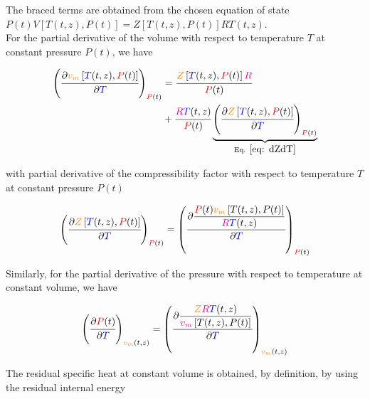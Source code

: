 \documentclass[../Article_Model_Parameters.tex]{subfiles}
\begin{document}
	The braced terms are obtained from the chosen equation of state $P(t) V\left[T(t,z),P(t)\right] = Z\left[T(t,z),P(t)\right] R T(t,z)$. \\
	
	For the partial derivative of the volume with respect to temperature $T$ at constant pressure $P(t)$, we have

	{\footnotesize
	\begin{align}
		\left( \cfrac{\partial {\color{orange}v_m}\left[{\color{blue}T}(t,z), {\color{red}P}(t)\right]}{\partial {\color{blue}T}} \right)_{{\color{red}P}(t)} &= \cfrac{{\color{orange}Z}\left[{\color{blue}T}(t,z), {\color{red}P}(t)\right] {\color{magenta}R}}{{\color{red}P}(t)} \nonumber \\
		&+ \cfrac{{\color{magenta}R}{\color{blue}T}(t,z)}{{\color{red}P}(t)} \underbrace{\left( \cfrac{\partial {\color{orange}Z}\left[{\color{blue}T}(t,z), {\color{red}P}(t)\right]}{\partial {\color{blue}T}} \right)_{{\color{red}P}(t)}}_{\text{Eq. }\eqref{eq: dZdT}} \label{eq: dVdT}
	\end{align} }
 
	with partial derivative of the compressibility factor with respect to temperature $T$ at constant pressure $P(t)$

	{\footnotesize
	\begin{equation}
		\left(\cfrac{\partial{\color{orange}Z}\left[{\color{blue}T}(t,z), {\color{red}P}(t)\right]}{\partial {\color{blue}T}}\right)_{{\color{red}P}(t)} = \left(\cfrac{\partial \dfrac{{\color{red}P}(t) {\color{orange}v_m}\left[T(t,z),P(t)\right]}{{\color{magenta}R}{\color{blue}T}(t,z)}}{\partial {\color{blue}T}}\right)_{{\color{red}P}(t)} \label{eq: dZdT}
	\end{equation} }

	Similarly, for the partial derivative of the pressure with respect to temperature at constant volume, we have
	
	{\footnotesize
	\begin{equation}
		\left(\cfrac{\partial {\color{red}P}(t)}{\partial {\color{blue}T}}\right)_{{\color{orange}v_m}(t,z)} = \left( \cfrac{\partial{\dfrac{{\color{orange}Z}{\color{magenta}R}{\color{blue}T}(t,z)}{{\color{magenta}v_m}\left[T(t,z),P(t)\right]}}}{\partial{\color{blue}T}}\right)_{{\color{orange}v_m}(t,z)} \label{eq: dPdT}
	\end{equation} }
	
	The residual specific heat at constant volume is obtained, by definition, by using the residual internal energy
	
\end{document}
